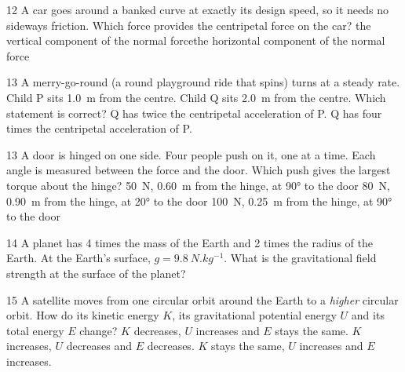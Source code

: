 \begin{practiceq}{1}{2}\label{pq:banked}
A car goes around a banked curve at exactly its design speed, so it needs no sideways
friction. Which force provides the centripetal force on the car?
  {the vertical component of the normal force}{the horizontal component of the normal force}
\end{practiceq}

\begin{practiceq}{1}{3}\label{pq:merry}
A merry-go-round (a round playground ride that spins) turns at a steady rate. Child P sits
\qty{1.0}{m} from the centre. Child Q
sits \qty{2.0}{m} from the centre. Which statement is correct?
  {Q has twice the centripetal acceleration of P.}
  {Q has four times the centripetal acceleration of P.}
\end{practiceq}

\begin{practiceq}{1}{3}\label{pq:door}
A door is hinged on one side. Four people push on it, one at a time. Each angle is measured
between the force and the door. Which push gives the largest torque about the hinge?
  {\qty{50}{N}, \qty{0.60}{m} from the hinge, at \ang{90} to the door}
  {\qty{80}{N}, \qty{0.90}{m} from the hinge, at \ang{20} to the door}
  {\qty{100}{N}, \qty{0.25}{m} from the hinge, at \ang{90} to the door}
\end{practiceq}

\begin{practiceq}{1}{4}\label{pq:planetg}
A planet has 4 times the mass of the Earth and 2 times the radius of the Earth. At the
Earth's surface, $g = \qty{9.8}{N.kg^{-1}}$. What is the gravitational field strength at the
surface of the planet?
\end{practiceq}

\begin{practiceq}{1}{5}\label{pq:higher}
A satellite moves from one circular orbit around the Earth to a \emph{higher} circular orbit.
How do its kinetic energy $K$, its gravitational potential energy $U$ and its total energy
$E$ change?
  {$K$ decreases, $U$ increases and $E$ stays the same.}
  {$K$ increases, $U$ decreases and $E$ decreases.}
  {$K$ stays the same, $U$ increases and $E$ increases.}
\end{practiceq}

